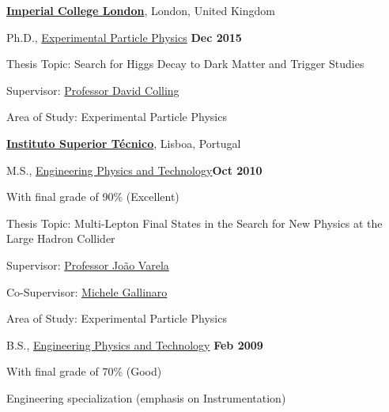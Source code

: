 \documentclass[10pt]{article}
\newenvironment{outerlist}[1][\enskip\textbullet]%
        {\begin{itemize}[#1]}{\end{itemize}%
         \vspace{-.6\baselineskip}}
\newenvironment{innerlist}[1][\enskip\textbullet]%
        {\begin{compactitem}[#1]}{\end{compactitem}}
\newcommand{\blankline}{\quad\pagebreak[2]}
\begin{document}
\href{http://www.imperial.ac.uk/}{\textbf{Imperial College London}}, 
London, United Kingdom
\begin{outerlist}
\item[] Ph.D., \href{http://www.hep.ic.ac.uk/}
             {Experimental Particle Physics} \hfill \textbf{Dec 2015}
        \begin{innerlist}
        \item Thesis Topic: Search for Higgs Decay to Dark Matter and Trigger Studies
        \item Supervisor: 
              \href{http://www.hep.ic.ac.uk/}
                   {Professor David Colling}
        \item Area of Study: Experimental Particle Physics
        \end{innerlist}
\end{outerlist}
\blankline

\href{http://www.ist.utl.pt/}{\textbf{Instituto Superior Técnico}}, 
Lisboa, Portugal
\begin{outerlist}

\item[] M.S., 
        \href{http://www.fisica.ist.utl.pt/}
             {Engineering Physics and Technology}\hfill \textbf{Oct 2010}
        \begin{innerlist}
        \item With final grade of 90\% (Excellent)
        \item Thesis Topic: Multi-Lepton Final States in the Search for New Physics at the Large Hadron Collider
        \item Supervisor: 
              \href{http://www.lip.pt/~varela/}
                   {Professor João Varela}
        \item Co-Supervisor: 
              \href{http://www.lip.pt/~michgall/}
                   {Michele Gallinaro}
        \item Area of Study: Experimental Particle Physics
        \end{innerlist}

\item[] B.S., 
        \href{http://www.fisica.ist.utl.pt/}
             {Engineering Physics and Technology} \hfill \textbf{Feb 2009}
        \begin{innerlist}
        \item With final grade of 70\%  (Good)
        \item Engineering specialization (emphasis on Instrumentation)
        \end{innerlist}

\end{outerlist}
\end{document}
